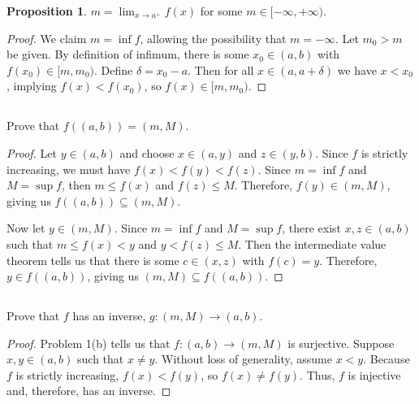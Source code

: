 \documentclass[12pt]{article}
\newenvironment{problem}
    {\begin{lrbox}{\mybox}\begin{minipage}{0.98\textwidth}}
    {\end{minipage}\end{lrbox}\begin{center}\framebox[\textwidth]{\usebox{\mybox}}\end{center}}
\theoremstyle{definition}
\newtheorem{proposition}{Proposition}
\newcommand{\ds}{\displaystyle}
\begin{document}
\begin{proposition}
    $m = \ds\lim_{x\to a^+} f(x)$ for some $m \in [-\infty, +\infty)$.
\end{proposition}

\begin{proof}
    We claim $m = \inf f$, allowing the possibility that $m = -\infty$. Let $m_0 > m$ be given. By definition of infimum, there is some $x_0 \in (a, b)$ with $f(x_0) \in [m, m_0)$. Define $\delta = x_0 - a$. Then for all $x \in (a, a + \delta)$ we have $x < x_0$, implying $f(x) < f(x_0)$, so $f(x) \in [m, m_0)$.
    
\end{proof}

\subsection{}
\begin{problem}
    Prove that $f((a,b)) = (m,M)$.
\end{problem}

\begin{proof}
    Let $y \in (a, b)$ and choose $x \in (a, y)$ and $z \in (y, b)$. Since $f$ is strictly increasing, we must have $f(x) < f(y) < f(z)$. Since $m = \inf f$ and $M = \sup f$, then $m \leq f(x)$ and $f(z) \leq M$. Therefore, $f(y) \in (m, M)$, giving us $f((a, b)) \subseteq (m, M)$.
    
    Now let $y \in (m, M)$. Since $m = \inf f$ and $M = \sup f$, there exist $x, z \in (a, b)$ such that $m \leq f(x) < y$ and $y < f(z) \leq M$. Then the intermediate value theorem tells us that there is some $c \in (x, z)$ with $f(c) = y$. Therefore, $y \in f((a, b))$, giving us $(m, M) \subseteq f((a, b))$.
    
\end{proof}

\subsection{}
\begin{problem}
    Prove that $f$ has an inverse, $g:(m,M)\to (a,b)$.
\end{problem}

\begin{proof}
    Problem 1(b) tells us that $f : (a, b) \to (m, M)$ is surjective. Suppose $x, y \in (a, b)$ such that $x \ne y$. Without loss of generality, assume $x < y$. Because $f$ is strictly increasing, $f(x) < f(y)$, so $f(x) \ne f(y)$. Thus, $f$ is injective and, therefore, has an inverse.
    
\end{proof}
\end{document}
